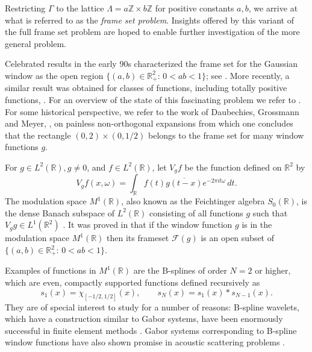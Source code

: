 \documentclass{article}
\newcommand{\R}{\mathbb{R}}
\newcommand{\Z}{\mathbb{Z}}
\begin{document}




Restricting
\(\Gamma\) to the lattice \(\Lambda = a\Z \times b\Z\) for positive
constants \(a,b\), we arrive at what is referred to as the
\textit{frame set problem}. Insights offered by this variant of the
full frame set problem are hoped to enable further investigation of the
more general problem. 



Celebrated results in the early 90s characterized the frame set for the
Gaussian window as the open region $\{(a, b) \in \R^2_+: \, 0<ab<1\}$;  see \cite{seip1992density, seip1992density_bis, Lyubarskii92}. 
More recently, a similar result was obtained for classes of functions, including totally positive functions,  \cite{Grosto, Kloosto, grochenig2018sampling, grochenig2023totally}. For an overview of the state of this fascinating problem we refer to \cite{Olehon, grochenig2014mystery}. For some historical perspective, we refer to the work of Daubechies, Grossmann and Meyer, \cite{daubechies1986painless},   on painless non-orthogonal expansions from which one concludes that the rectangle $(0, 2)\times (0, 1/2)$ belongs to the frame set for many window functions $g$. 


For $g\in L^2(\R), g\neq 0$, and $f\in L^2(\R)$, let $V_gf$ be the function defined on $\R^2$ by $$V_{g}f(x, \omega)=\int_{\R}f(t)\overline{g(t-x)}e^{-2\pi i t\omega}\, dt.$$ The modulation space $M^{1}(\R)$, also known as the Feichtinger algebra $S_0(\R)$, is the dense Banach subspace of $L^2(\R)$ consisting of all functions $g$ such that $V_gg\in L^1(\R^2)$ \cite{BenOko20, Groc2001}. It was proved in \cite{FeiKai04} that if the window function $g$ is in the modulation space $ M^1(\R)$  then its frameset $\mathcal{F}(g)$ is an open subset of $\{(a, b) \in \R^2_+: \, 0<ab<1\}$. 



Examples of functions in $M^1(\mathbb{R})$ are the B-splines of order $N=2$ or higher, which are  even, compactly supported functions defined
recursively as
\begin{equation}\label{eq:sn}
	s_1(x) = \chi_{[-1/2, 1/2]}(x), \qquad s_N(x) = s_1(x) * s_{N-1}(x).
\end{equation}
They are of special interest to study for a number of reasons:
B-spline wavelets, which have a construction similar to Gabor
systems, have been enormously successful in finite element methods
\cite{xiang2006construction, jiawei2008new, xiang2006identification, wei2021b}. Gabor systems
corresponding to B-spline window functions have also shown promise
in acoustic scattering problems \cite{Kreuzer2019}.
\end{document}
